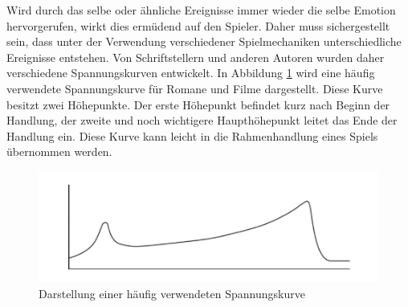 

%

%

Wird durch das selbe oder ähnliche Ereignisse immer wieder die selbe Emotion hervorgerufen, wirkt dies ermüdend auf den Spieler. Daher muss sichergestellt sein, dass unter der Verwendung verschiedener Spielmechaniken unterschiedliche Ereignisse entstehen. Von Schriftstellern und anderen Autoren wurden daher verschiedene  Spannungskurven entwickelt. In Abbildung \ref{spannungskurve} wird eine häufig verwendete Spannungskurve für Romane und Filme dargestellt. Diese Kurve besitzt zwei Höhepunkte. Der erste Höhepunkt befindet kurz nach Beginn der Handlung, der zweite und noch wichtigere Haupthöhepunkt leitet das Ende der Handlung ein. Diese Kurve kann leicht in die Rahmenhandlung eines Spiels übernommen werden. 
\begin{figure}[H]
    \centering
    \includegraphics[width=.8\textwidth]{files/games/spannungskurve}
    \caption{Darstellung einer häufig verwendeten Spannungskurve \cite[S. 37]{Adams:1515529}}
    \label{spannungskurve}
\end{figure}

